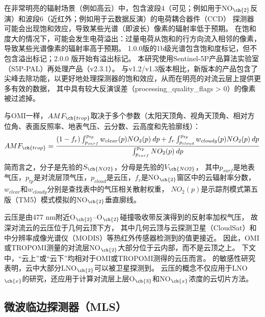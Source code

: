在非常明亮的辐射场景（例如高云）中，包含波段4（可见；例如用于NO$_{\ch{2}}$反演）和波段6（近红外；例如用于云数据反演）的电荷耦合器件（CCD） 探测器可能会出现饱和效应\citep{Ludewig.2020}，导致某些光谱（即波长）像素的辐射率低于预期。
在饱和度大的情况下，可能会发生电荷溢出：过量电荷从饱和的行方向流入相邻的像素，导致某些光谱像素的辐射率高于预期。
1.0.0版的1b级光谱包含饱和度标记，但不包含溢出标记；2.0.0 版开始有溢出标记\citep{Ludewig.2020}。
本研究使用Sentinel-5P产品算法实验室（S5P-PAL）再处理产品（v2.3.1）。
与v1.2/v1.3版本相比，新版本的产品包含了尖峰去除功能，以更好地处理探测器的饱和效应，从而在明亮的对流云层上提供更多有效的数据\citep{Ludewig.2020,VanGeffen.2022}，
其中具有较大反演误差（processing\_quality\_flags > 0）的像素被过滤掉。

与OMI一样，$AMF_{\ch{trop}}$取决于多个参数（太阳天顶角、视角天顶角、相对方位角、表面反照率、地表气压、云分数、云高度和先验廓线）：
\begin{equation} \label{eq:AMF_NO2}
AMF_{\ch{trop}} = \frac{(1-f_r) \int_{p_{surf}}^{p_{tp}} w_{clear}(p) NO_2(p) \: dp + f_r \int_{p_{cloud}}^{p_{tp}} w_{cloudy}(p) NO_2(p) \: dp}{\int_{p_{surf}}^{p_{tp}} NO_2(p) \: dp}
\end{equation}
简而言之，分子是先验的$S_{\ch{NO2}}$，分母是先验的$V_{\ch{NO2}}$，
其中$p_{surf}$是地表气压，$p_{tp}$是对流层顶气压，$p_{cloud}$是云压，$f_{r}$是NO$_{\ch{2}}$窗区中的云辐射率分数，
$w_{clear}$和$w_{cloudy}$分别是查找表中的气压相关散射权重\citep{Lorente.2017}，
$NO_2(p)$是示踪剂模式第五版（TM5）模式模拟的NO$_{\ch{2}}$垂直廓线。

云压是由477 nm附近O$_{\ch{2}}$--O$_{\ch{2}}$碰撞吸收带反演得到的反射率加权气压\citep{Acarreta.2004,Sneep.2008,Stammes.2008}，
故深对流云的云压位于几何云顶下方，
其中几何云顶与云探测卫星（CloudSat）和中分辨率成像光谱仪（MODIS）等热红外传感器检测到的值更接近\citep{Vasilkov.2008,Joiner.2012}。
因此，OMI或TROPOMI测量的对流层NO$_{\ch{2}}$大部分位于云内部，而不是云顶之上。
下文中，“云上”或“云下”均相对于OMI或TROPOMI测得的云压而言。
\citet{Beirle.2009}的敏感性研究表明，云中大部分LNO$_{\ch{2}}$可以被卫星探测到。
云压的概念不仅应用于LNO$_{\ch{x}}$的研究，还应用于计算对流层上层O$_{\ch{3}}$和NO$_{\ch{x}}$浓度的云切片方法\citep{Ziemke.2009,Choi.2014,Strode.2017,Ziemke.2017,Marais.2018}。


\subsection{微波临边探测器（MLS）}

